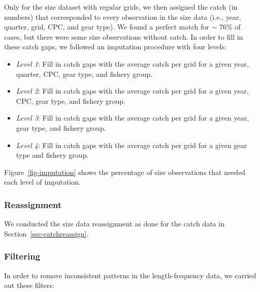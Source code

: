 \documentclass[
]{scrartcl}
\providecommand{\tightlist}{%
  \setlength{\itemsep}{0pt}\setlength{\parskip}{0pt}}\usepackage{longtable,booktabs,array}
\begin{document}
Only for the size dataset with regular grids, we then assigned the catch
(in numbers) that corresponded to every observation in the size data
(i.e., year, quarter, grid, CPC, and gear type). We found a perfect
match for \(\sim\) 76\% of cases, but there were some size observations
without catch. In order to fill in these catch gaps, we followed an
imputation procedure with four levels:

\begin{itemize}
\tightlist
\item
  \emph{Level 1}: Fill in catch gaps with the average catch per grid for
  a given year, quarter, CPC, gear type, and fishery group.
\item
  \emph{Level 2}: Fill in catch gaps with the average catch per grid for
  a given year, CPC, gear type, and fishery group.
\item
  \emph{Level 3}: Fill in catch gaps with the average catch per grid for
  a given year, gear type, and fishery group.
\item
  \emph{Level 4}: Fill in catch gaps with the average catch per grid for
  a given gear type and fishery group.
\end{itemize}

Figure~\ref{fig-imputation} shows the percentage of size observations
that needed each level of imputation.

\subsubsection{Reassignment}\label{reassignment}

We conducted the size data reassignment as done for the catch data in
Section~\ref{sec-catchreassign}.

\subsubsection{Filtering}\label{filtering}

In order to remove inconsistent patterns in the length-frequency data,
we carried out these filters:
\end{document}
